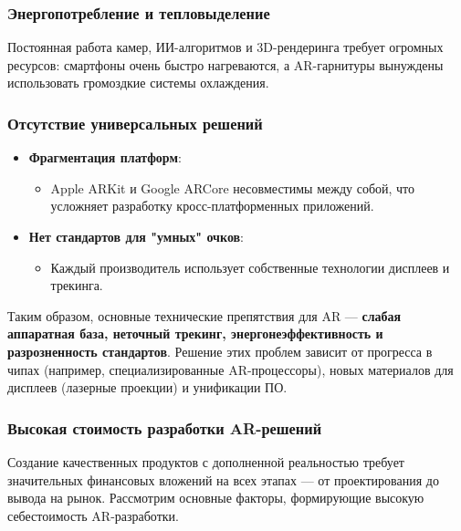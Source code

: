 \subsubsection{Энергопотребление и тепловыделение}
Постоянная работа камер, ИИ-алгоритмов и 3D-рендеринга требует огромных ресурсов: смартфоны очень быстро нагреваются, а AR-гарнитуры вынуждены использовать громоздкие системы охлаждения.

\subsubsection{Отсутствие универсальных решений}
\begin{itemize}
    \item \textbf{Фрагментация платформ}:
    \begin{itemize}
        \item Apple ARKit и Google ARCore несовместимы между собой, что усложняет разработку кросс-платформенных приложений.
    \end{itemize}
    \item \textbf{Нет стандартов для "умных" очков}:
    \begin{itemize}
        \item Каждый производитель использует собственные технологии дисплеев и трекинга.
    \end{itemize}
\end{itemize}

Таким образом, основные технические препятствия для AR --- \textbf{слабая аппаратная база, неточный трекинг, энергонеэффективность и разрозненность стандартов}. Решение этих проблем зависит от прогресса в чипах (например, специализированные AR-процессоры), новых материалов для дисплеев (лазерные проекции) и унификации ПО.

\subsubsection{Высокая стоимость разработки AR-решений}
Создание качественных продуктов с дополненной реальностью требует значительных финансовых вложений на всех этапах --- от проектирования до вывода на рынок. Рассмотрим основные факторы, формирующие высокую себестоимость AR-разработки.

